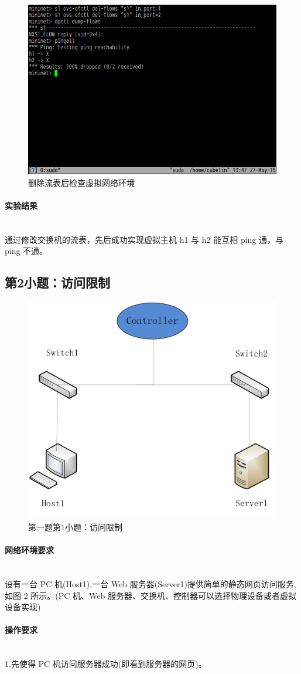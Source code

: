 \documentclass[format=draft,language=chinese,category=SDN]{hustreport}
\newcommand{\myparagraph}[1]{\paragraph{#1}\mbox{}\\}
\begin{document}
\begin{figure}[!h]
\centering
\includegraphics[width=.618\textwidth]{fig/1_1-2.png}
\caption{删除流表后检查虚拟网络环境}\label{fig:Q1_1-2}
\end{figure}

\myparagraph{实验结果}

通过修改交换机的流表，先后成功实现虚拟主机 h1 与 h2 能互相 ping 通，与 ping 不通。


\subsection{第2小题：访问限制}\label{sec:Q1_2}

\begin{figure}[!h]
\centering
\includegraphics[width=.618\textwidth]{fig/1_2-0.png}
\caption{第一题第1小题：访问限制}\label{fig:Q1_2-0}
\end{figure}

\myparagraph{网络环境要求}

设有一台 PC 机(Host1),一台 Web 服务器(Server1)提供简单的静态网页访问服务,如图 2 所示。(PC 机、Web 服务器、交换机、控制器可以选择物理设备或者虚拟设备实现)

\myparagraph{操作要求}

1.先使得 PC 机访问服务器成功(即看到服务器的网页)。
\end{document}

